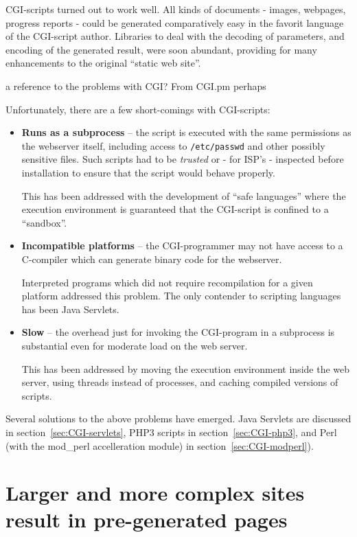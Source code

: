 CGI-scripts turned out to work well.  All kinds of documents - images,
webpages, progress reports - could be generated comparatively easy in
the favorit language of the CGI-script author.  Libraries to deal with
the decoding of parameters, and encoding of the generated result, were
soon abundant, providing for many enhancements to the original
``static web site''.

\textsf{a reference to the problems with CGI?  From CGI.pm perhaps}

Unfortunately, there are a few short-comings with CGI-scripts:

\begin{itemize}
\item \textbf{Runs as a subprocess} -- the script is executed with the
  same permissions as the webserver itself, including access to
  \texttt{/etc/passwd} and other possibly sensitive files.  Such
  scripts had to be \textit{trusted} or - for ISP's - inspected before
  installation to ensure that the script would behave properly.

  This has been addressed with the development of ``safe languages''
  where the execution environment is guaranteed that the CGI-script is
  confined to a ``sandbox''.
  
\item \textbf{Incompatible platforms} -- the CGI-programmer may not
  have access to a C-compiler which can generate binary code for the
  webserver.

  Interpreted programs which did not require recompilation for a given
  platform addressed this problem.   The only contender to scripting
  languages has been Java Servlets.
  
\item \textbf{Slow} -- the overhead just for invoking the CGI-program
  in a subprocess is substantial even for moderate load on the web
  server.

  This has been addressed by moving the execution environment inside
  the web server, using threads instead of processes, and caching
  compiled versions of scripts.  

\end{itemize}

Several solutions to the above problems have emerged.  Java Servlets
are discussed in section~\vref{sec:CGI-servlets},  PHP3 scripts in
section~\vref{sec:CGI-php3}, and Perl (with the mod\_perl
accelleration module) in section~\vref{sec:CGI-modperl}).

\section{Larger and more complex sites result in pre-generated pages}


